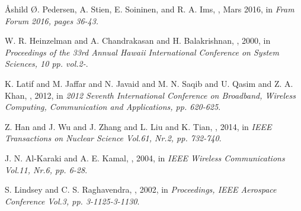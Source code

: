 \documentclass[USenglish]{uit-thesis}
\begin{document}
\backmatter


\newpage{}

\begin{thebibliography}{9}

Åshild Ø. Pedersen, A. Stien, E. Soininen, and R. A. Ims,
, Mars 2016,
\newblock in {\em  Fram Forum 2016, pages 36-43.}

W. R. Heinzelman and A. Chandrakasan and H. Balakrishnan,
, 2000,
\newblock in {\em Proceedings of the 33rd Annual Hawaii International Conference on System Sciences, 10 pp. vol.2-}.

K. Latif and M. Jaffar and N. Javaid and M. N. Saqib and U. Qasim and Z. A. Khan,
, 2012,
\newblock in {\em 2012 Seventh International Conference on Broadband, Wireless Computing, Communication and Applications, pp. 620-625}.


Z. Han and J. Wu and J. Zhang and L. Liu and K. Tian,
, 2014,
\newblock in {\em IEEE Transactions on Nuclear Science Vol.61, Nr.2, pp. 732-740}.

J. N. Al-Karaki and A. E. Kamal,
, 2004,
\newblock in {\em IEEE Wireless Communications Vol.11, Nr.6, pp. 6-28}.

S. Lindsey and C. S. Raghavendra,
, 2002,
\newblock in {\em Proceedings, IEEE Aerospace Conference Vol.3, pp. 3-1125-3-1130}.



\end{thebibliography}
\end{document}

